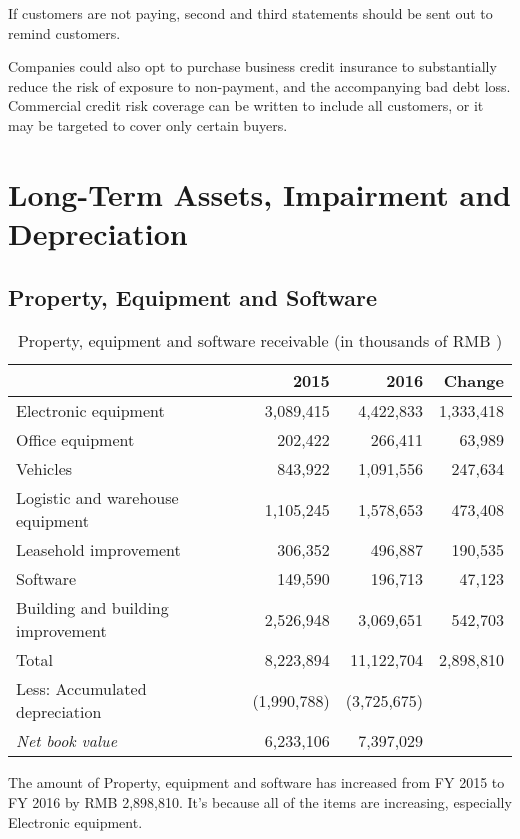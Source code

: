 If customers are not paying, second and third statements should be sent out to remind customers.  
 
Companies could also opt to purchase business credit insurance to substantially reduce the risk of exposure to non-payment, and the accompanying bad debt loss. Commercial credit risk coverage can be written to include all customers, or it may be targeted to cover only certain buyers.

\section{Long-Term Assets, Impairment and Depreciation} 
\subsection{Property, Equipment and Software}

\begin{table}[H]	
	\begin{center}
		\begin{tabular}{lrrr}
			\toprule
			&\textbf{2015}&\textbf{2016}&\textbf{Change}\\
			\midrule
			Electronic equipment &	3,089,415&	4,422,833&	1,333,418\\
			Office equipment  &	202,422&	266,411&	63,989\\
			Vehicles&	843,922&	1,091,556&	247,634\\
			Logistic and warehouse equipment &	1,105,245&	1,578,653&	473,408\\
			Leasehold improvement&	306,352&	496,887&	190,535\\
			Software& 	149,590&	196,713&	47,123\\
			Building and building improvement & 	2,526,948&	3,069,651&	542,703\\
			Total  &	8,223,894&	11,122,704&	2,898,810\\
			Less: Accumulated depreciation&	(1,990,788)&	(3,725,675)	& \\
			\qquad\emph{Net book value} &	6,233,106&	7,397,029& \\
			\bottomrule
		\end{tabular}
	\end{center}
	\caption{Property, equipment and software receivable (in thousands of RMB \textyen)}\label{table:1}
\end{table}
	
The amount of Property, equipment and software has increased from FY 2015 to FY 2016 by RMB 2,898,810. It’s because all of the items are increasing, especially Electronic equipment.

